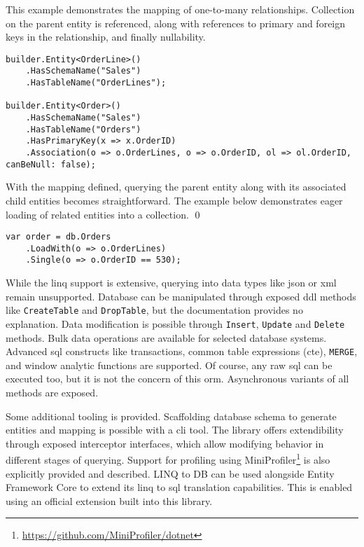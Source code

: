 \begin{example}
\small
This example demonstrates the mapping of one-to-many relationships. Collection on the parent entity is referenced, along with references to primary and foreign keys in the relationship, and finally nullability.

\begin{lstlisting}[language=CSharp]
builder.Entity<OrderLine>()
    .HasSchemaName("Sales")
    .HasTableName("OrderLines");

builder.Entity<Order>()
    .HasSchemaName("Sales")
    .HasTableName("Orders")
    .HasPrimaryKey(x => x.OrderID)
    .Association(o => o.OrderLines, o => o.OrderID, ol => ol.OrderID, canBeNull: false);
\end{lstlisting}

\small With the mapping defined, querying the parent entity along with its associated child entities becomes straightforward. The example below demonstrates eager loading of related entities into a collection.
\qed

\begin{lstlisting}[language=CSharp]
var order = db.Orders
    .LoadWith(o => o.OrderLines)
    .Single(o => o.OrderID == 530);
\end{lstlisting}
\end{example}

While the \acrshort{linq} support is extensive, querying into data types like \acrshort{json} or \acrshort{xml} remain unsupported. 
Database can be manipulated through exposed \acrshort{ddl} methods like \texttt{CreateTable} and \texttt{DropTable}, but the documentation provides no explanation. Data modification is possible through \texttt{Insert}, \texttt{Update} and \texttt{Delete} methods. Bulk data operations are available for selected database systems.
Advanced \acrshort{sql} constructs like transactions, common table expressions (\acrshort{cte}), \texttt{MERGE}, and window analytic functions are supported. Of course, any raw \acrshort{sql} can be executed too, but it is not the concern of this \acrshort{orm}. Asynchronous variants of all methods are exposed.

Some additional tooling is provided. Scaffolding database schema to generate entities and mapping is possible with a \acrshort{cli} tool. The library offers extendibility through exposed interceptor interfaces, which allow modifying behavior in different stages of querying. Support for profiling using MiniProfiler\footnote{\url{https://github.com/MiniProfiler/dotnet}} is also explicitly provided and described.
LINQ to DB can be used alongside Entity Framework Core to extend its \acrshort{linq} to \acrshort{sql} translation capabilities. This is enabled using an official extension built into this library.

